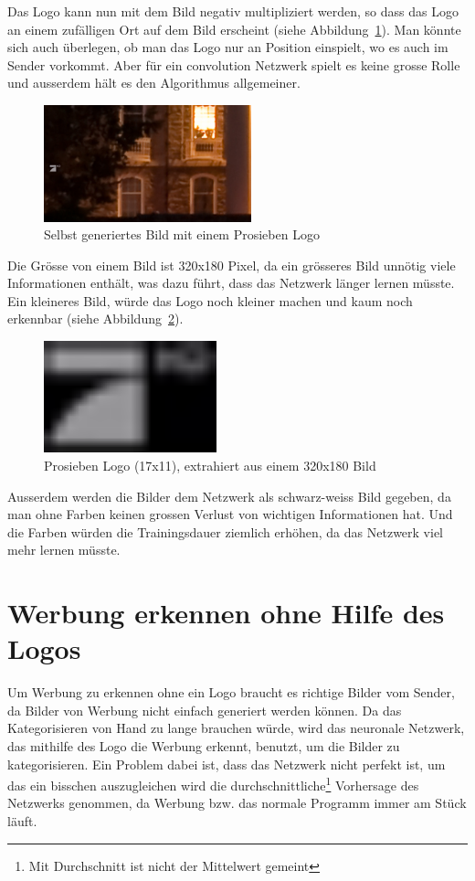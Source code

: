 \documentclass[12pt,a4paper]{report}
\begin{document}
Das Logo kann nun mit dem Bild negativ multipliziert werden, so dass das Logo an einem zufälligen Ort auf dem Bild erscheint (siehe Abbildung~\ref{fig:logo8}).
Man könnte sich auch überlegen, ob man das Logo nur an Position einspielt, wo es auch im Sender vorkommt.
Aber für ein convolution Netzwerk spielt es keine grosse Rolle und ausserdem hält es den Algorithmus allgemeiner.
\begin{figure}[h]%
    \centering
    \includegraphics[width=6cm]{assets/images/logo_on_random_image.png}%
    \caption{Selbst generiertes Bild mit einem Prosieben Logo}%
    \label{fig:logo8}%
\end{figure}
Die Grösse von einem Bild ist 320x180 Pixel, da ein grösseres Bild unnötig viele Informationen enthält,
was dazu führt, dass das Netzwerk länger lernen müsste.
Ein kleineres Bild, würde das Logo noch kleiner machen und kaum noch erkennbar (siehe Abbildung~\ref{fig:logo6}).
\begin{figure}[h]%
    \centering
    \includegraphics[width=5cm]{assets/images/logo17x11.png}%
    \caption{Prosieben Logo (17x11), extrahiert aus einem 320x180 Bild}%
    \label{fig:logo6}%
\end{figure}
Ausserdem werden die Bilder dem Netzwerk als schwarz-weiss Bild gegeben,
da man ohne Farben keinen grossen Verlust von wichtigen Informationen hat.
Und die Farben würden die Trainingsdauer ziemlich erhöhen,
da das Netzwerk viel mehr lernen müsste.
\section{Werbung erkennen ohne Hilfe des Logos}
Um Werbung zu erkennen ohne ein Logo braucht es richtige Bilder vom Sender, da Bilder von Werbung nicht einfach generiert werden können.
Da das Kategorisieren von Hand zu lange brauchen würde, wird das neuronale Netzwerk, das mithilfe des Logo die Werbung erkennt, benutzt,
um die Bilder zu kategorisieren.
Ein Problem dabei ist, dass das Netzwerk nicht perfekt ist,
um das ein bisschen auszugleichen wird die durchschnittliche\footnote{Mit Durchschnitt ist nicht der Mittelwert gemeint} Vorhersage des Netzwerks genommen,
da Werbung bzw. das normale Programm immer am Stück läuft.
\end{document}
